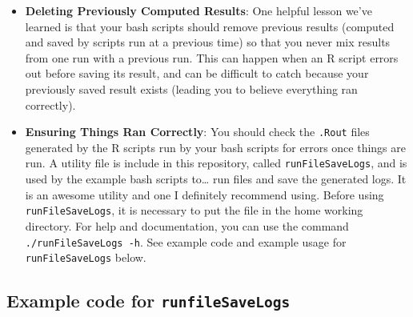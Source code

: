 \documentclass[]{book}
\begin{document}
\begin{itemize}
\item
  \textbf{Deleting Previously Computed Results}: One helpful lesson
  we've learned is that your bash scripts should remove previous results
  (computed and saved by scripts run at a previous time) so that you
  never mix results from one run with a previous run. This can happen
  when an R script errors out before saving its result, and can be
  difficult to catch because your previously saved result exists
  (leading you to believe everything ran correctly).
\item
  \textbf{Ensuring Things Ran Correctly}: You should check the
  \texttt{.Rout} files generated by the R scripts run by your bash
  scripts for errors once things are run. A utility file is include in
  this repository, called \texttt{runFileSaveLogs}, and is used by the
  example bash scripts to\ldots{} run files and save the generated logs.
  It is an awesome utility and one I definitely recommend using. Before
  using \texttt{runFileSaveLogs}, it is necessary to put the file in the
  home working directory. For help and documentation, you can use the
  command \texttt{./runFileSaveLogs\ -h}. See example code and example
  usage for \texttt{runFileSaveLogs} below.
\end{itemize}

\subsection{\texorpdfstring{Example code for
\texttt{runfileSaveLogs}}{Example code for runfileSaveLogs}}\label{example-code-for-runfilesavelogs}
\end{document}
